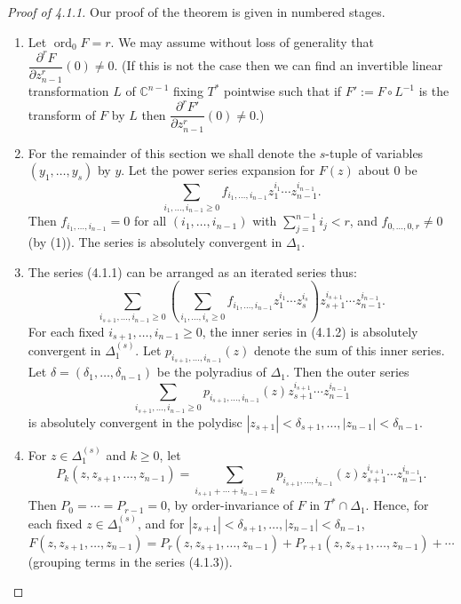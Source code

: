 \documentclass[11pt]{article}
\theoremstyle{plain}
\theoremstyle{definition}
\newcommand{\C}{\mathbb{C}}
\DeclareMathOperator{\ord}{ord}
\begin{document}
\begin{proof}[Proof of 4.1.1]
Our proof of the theorem is given in numbered stages.

\begin{enumerate}
\item Let $\ord_0 F = r$. We may assume without loss of generality
that $\dfrac{\partial^r F}{\partial z_{n-1}^r}(0) \ne 0$. (If this is
not the case then we can find an invertible linear transformation $L$
of $\C^{n-1}$ fixing $T^*$ pointwise such that if $F' := F \circ L^{-1}$
is the transform of $F$ by $L$ then
$\dfrac{\partial^r F'}{\partial z_{n-1}^r}(0) \ne 0$.)

\item For the remainder of this section we shall denote the $s$-tuple
of variables $(y_1, \ldots, y_s)$ by $y$. Let the power series
expansion for $F(z)$ about $0$ be
\begin{equation}
\sum_{i_1, \ldots, i_{n-1} \ge 0} f_{i_1, \ldots, i_{n-1}}
z_1^{i_1} \cdots z_{n-1}^{i_{n-1}}. \tag{4.1.1}
\end{equation}
Then $f_{i_1, \ldots, i_{n-1}} = 0$ for all
$(i_1, \ldots, i_{n-1})$ with $\sum_{j=1}^{n-1} i_j < r$, and
$f_{0, \ldots, 0, r} \ne 0$ (by (1)). The series is absolutely
convergent in $\Delta_1$.

\item The series (4.1.1) can be arranged as an iterated series thus:
\begin{equation}
\sum_{i_{s+1}, \ldots, i_{n-1} \ge 0}
\left( \sum_{i_1, \ldots, i_s \ge 0}
f_{i_1, \ldots, i_{n-1}} z_1^{i_1} \cdots z_s^{i_s} \right)
z_{s+1}^{i_{s+1}} \cdots z_{n-1}^{i_{n-1}}. \tag{4.1.2}
\end{equation}
For each fixed $i_{s+1}, \ldots, i_{n-1} \ge 0$, the inner series in
(4.1.2) is absolutely convergent in $\Delta_1^{(s)}$. Let
$p_{i_{s+1}, \ldots, i_{n-1}}(z)$ denote the sum of this inner series.
Let $\delta = (\delta_1, \ldots, \delta_{n-1})$ be the polyradius of
$\Delta_1$. Then the outer series
\begin{equation}
\sum_{i_{s+1}, \ldots, i_{n-1} \ge 0}
p_{i_{s+1}, \ldots, i_{n-1}}(z)
z_{s+1}^{i_{s+1}} \cdots z_{n-1}^{i_{n-1}} \tag{4.1.3}
\end{equation}
is absolutely convergent in the polydisc
$|z_{s+1}| < \delta_{s+1}, \ldots, |z_{n-1}| < \delta_{n-1}$.

\item For $z \in \Delta_1^{(s)}$ and $k \ge 0$, let
\[
P_k(z, z_{s+1}, \ldots, z_{n-1}) = \sum_{i_{s+1} + \cdots + i_{n-1} = k}
p_{i_{s+1}, \ldots, i_{n-1}}(z)
z_{s+1}^{i_{s+1}} \cdots z_{n-1}^{i_{n-1}}.
\]
Then $P_0 = \cdots = P_{r-1} = 0$, by order-invariance of $F$ in
$T^* \cap \Delta_1$. Hence, for each fixed $z \in \Delta_1^{(s)}$, and
for $|z_{s+1}| < \delta_{s+1}, \ldots, |z_{n-1}| < \delta_{n-1}$,
\[
F(z, z_{s+1}, \ldots, z_{n-1}) = P_r(z, z_{s+1}, \ldots, z_{n-1})
+ P_{r+1}(z, z_{s+1}, \ldots, z_{n-1}) + \cdots
\]
(grouping terms in the series (4.1.3)).


\end{enumerate}
\end{proof}
\end{document}
